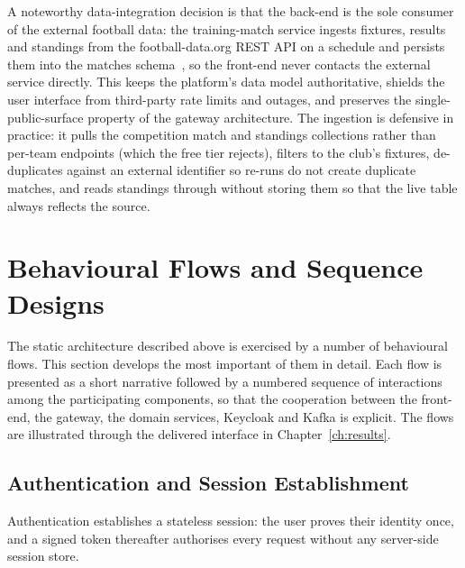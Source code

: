 A noteworthy data-integration decision is that the back-end is the sole consumer of
the external football data: the training-match service ingests fixtures, results and
standings from the football-data.org REST API on a schedule and persists them into the
matches schema~\cite{footballdata,restapi}, so the front-end never contacts the
external service directly. This keeps the platform's data model authoritative,
shields the user interface from third-party rate limits and outages, and preserves the
single-public-surface property of the gateway architecture. The ingestion is
defensive in practice: it pulls the competition match and standings collections rather
than per-team endpoints (which the free tier rejects), filters to the club's fixtures,
de-duplicates against an external identifier so re-runs do not create duplicate matches,
and reads standings through without storing them so that the live table always reflects
the source.

\section{Behavioural Flows and Sequence Designs}
\label{sec:flows}

The static architecture described above is exercised by a number of behavioural flows.
This section develops the most important of them in detail. Each flow is presented as a
short narrative followed by a numbered sequence of interactions among the participating
components, so that the cooperation between the front-end, the gateway, the domain
services, Keycloak and Kafka is explicit. The flows are illustrated through the
delivered interface in Chapter~\ref{ch:results}.

\subsection{Authentication and Session Establishment}
\label{sec:flow-login}

Authentication establishes a stateless session: the user proves their identity once,
and a signed token thereafter authorises every request without any server-side session
store.

